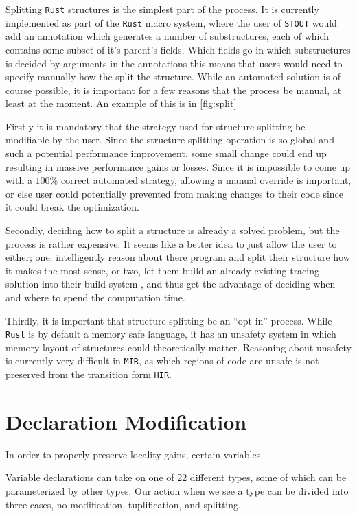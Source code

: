 \documentclass[12pt,oneside]{book}
\newcommand{\rustname}{{\texttt{Rust}}}
\def \rust {\rustname{}\xspace}
\newcommand{\mirname}{{\texttt{MIR}}}
\def \mir {\mirname{}\xspace}
\newcommand{\hirname}{{\texttt{HIR}}}
\def \hir {\hirname{}\xspace}
\newcommand{\projectname}{{\texttt{STOUT}}}
\def \name{\projectname\xspace}
\begin{document}
Splitting \rust structures is the simplest part of the process. It is currently
implemented as part of the \rust macro system, where the user of \name
would add an annotation which generates a number
of substructures, each of which contains some subset of it's parent's 
fields. Which fields go in which substructures is decided by arguments 
in the annotations 
this means
that users would need to specify manually how the split the structure. While an
automated solution is of course possible, it is important for a few reasons that
the process be manual, at least at the moment. An example of this
is in \ref{fig:split}

Firstly it is mandatory that the strategy used 
for structure splitting be modifiable by the user.
Since the structure splitting operation is so global 
and such a potential performance improvement,
some small change could end up resulting in 
massive performance gains or losses. Since it is impossible
to come up with a $100\%$ correct automated strategy, 
allowing a manual override is important, or else
user could potentially prevented from making changes to their code
since it could break the optimization.

Secondly, deciding how to split a structure is already a solved problem,
but the process is rather expensive. 
It seems like a better idea to just 
allow the user to either; one, 
intelligently reason about there program and split their structure 
how it makes the most sense, or two, 
let them build an already existing tracing solution into their build system
, and thus get the advantage
of deciding when and where to spend the computation time.

Thirdly, it is important that structure splitting be an ``opt-in'' process.
While \rust is by default a memory safe language, it has an
unsafety system in which memory layout of structures could theoretically matter.
Reasoning about unsafety is currently very difficult in \mir, as
which regions of code are unsafe is not preserved from the transition
form \hir.

\section{Declaration Modification}
In order to properly preserve locality gains, certain variables

Variable declarations can take on one of 22 different types, some of which can
be parameterized by other types. Our action when we see a type can be divided
into three cases, no modification, tuplification, and splitting.
\end{document}
